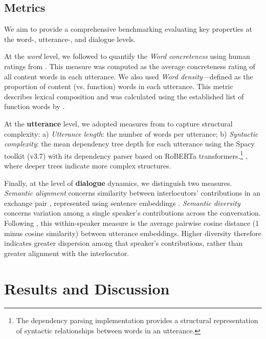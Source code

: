 \subsection{Metrics}

We aim to provide a comprehensive benchmarking evaluating key properties at the word-, utterance-, and dialogue levels.  


At the \textit{word} level, we followed \citet{dawson2021features} to quantify the \textit{Word concreteness} using human ratings from \citet{brysbaert2014concreteness}. This measure was computed as the average concreteness rating of all content words in each utterance. We also used \textit{Word density}---defined as the proportion of content (vs. function) words in each utterance. This metric describes lexical composition and was calculated using the established list of function words by \citet{o2012multi}.


At the \textbf{utterance} level, we adopted measures from \citet{rasanen2024age} to capture structural complexity: a) \textit{Utterance length}: the number of words per utterance; b) \textit{Syntactic complexity}: the mean dependency tree depth for each utterance using the Spacy toolkit (v3.7) with its dependency parser based on RoBERTa transformers.\footnote{The dependency parsing implementation provides a structural representation of syntactic relationships between words in an utterance.} \citep{liu2008dependency}, where deeper trees indicate more complex structures. 

Finally, at the level of \textbf{dialogue} dynamics, we distinguish two measures. \textit{Semantic alignment} concerns similarity between interlocutors' contributions in an exchange pair \citep{duran2019align,french2024aligning,misiek2020development}, represented using sentence embeddings \citep{reimers-2019-sentence-bert}. \textit{Semantic diversity} concerns variation among a single speaker's contributions across the conversation. Following \citet{guo2023curious}, this within-speaker measure is the average pairwise cosine distance (1 minus cosine similarity) between utterance embeddings. Higher diversity therefore indicates greater dispersion among that speaker's contributions, rather than greater alignment with the interlocutor.



\section{Results and Discussion}



